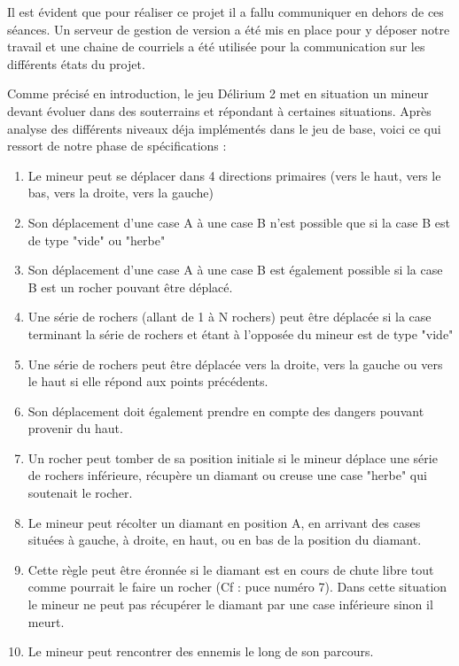 \documentclass[a4paper,11pt]{article}
\begin{document}
Il est \'evident que pour r\'ealiser ce projet il a fallu communiquer en dehors de ces s\'eances. Un serveur de gestion de version a  \'et\'e mis en place pour y d\'eposer notre travail et une chaine de courriels a \'et\'e utilis\'ee pour la communication sur les diff\'erents \'etats du projet.

Comme pr\'ecis\'e en introduction, le jeu D\'elirium 2 met en situation un mineur devant \'evoluer dans des souterrains et r\'epondant \`a certaines situations. Apr\`es analyse des diff\'erents niveaux d\'eja impl\'ement\'es dans le jeu de base, voici ce qui ressort de notre phase de sp\'ecifications :\\
		
		\begin{enumerate}
			\item Le mineur peut se d\'eplacer dans 4 directions primaires (vers le haut, vers le bas, vers la droite, vers la gauche)
			\item Son d\'eplacement d'une case A \`a une case B n'est possible que si la case B est de type "vide" ou "herbe"
			\item Son d\'eplacement d'une case A \`a une case B est \'egalement possible si la case B est un rocher pouvant \^etre d\'eplac\'e.
			\item Une s\'erie de rochers (allant de 1 \`a N rochers) peut \^etre d\'eplac\'ee si la case terminant la s\'erie de rochers et \'etant \`a l'oppos\'ee du mineur est de type "vide"
			\item Une s\'erie de rochers peut \^etre d\'eplac\'ee vers la droite, vers la gauche ou vers le haut si elle r\'epond aux points pr\'ec\'edents.
			\item Son d\'eplacement doit \'egalement prendre en compte des dangers pouvant provenir du haut.
			\item Un rocher peut tomber de sa position initiale si le mineur d\'eplace une s\'erie de rochers inf\'erieure, r\'ecup\`ere un diamant ou creuse une case "herbe" qui soutenait le rocher.
			\item Le mineur peut r\'ecolter un diamant en position A, en arrivant des cases situ\'ees \`a gauche, \`a droite, en haut, ou en bas de la position du diamant.
			\item Cette r\`egle peut \^etre \'eronn\'ee si le diamant est en cours de chute libre tout comme pourrait le faire un rocher (Cf : puce num\'ero 7). Dans cette situation le mineur ne peut pas r\'ecup\'erer le diamant par une case inf\'erieure sinon il meurt.
			\item Le mineur peut rencontrer des ennemis le long de son parcours.

\end{enumerate}
\end{document}
